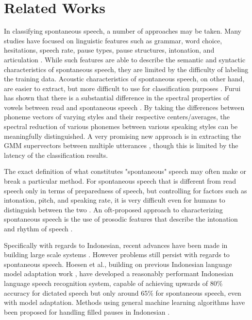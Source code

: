 \documentclass[conference]{IEEEtran}
\begin{document}
\section{Related Works}

In classifying spontaneous speech, a number of approaches may be taken.
Many studies have focused on linguistic features such as grammar, word choice, hesitations, speech rate, pause types, pause structures, intonation, and articulation \cite{barik}.
While such features are able to describe the semantic and syntactic characteristics of spontaneous speech, they are limited by the difficulty of labeling the training data.
Acoustic characteristics of spontaneous speech, on other hand, are easier to extract, but more difficult to use for classification purposes \cite{nakamura}.
Furui has shown that there is a substantial difference in the spectral properties of vowels between read and spontaneous speech \cite{furui1}.
By taking the differences between phoneme vectors of varying styles and their respective centers/averages, the spectral reduction of various phonemes between various speaking styles can be meaningfully distinguished.
A very promising new approach is in extracting the GMM supervectors between multiple utterances \cite{asami}, though this is limited by the latency of the classification results.

The exact definition of what constitutes "spontaneous" speech may often make or break a particular method.
For spontaneous speech that is different from read speech only in terms of preparedness of speech, but controlling for factors such as intonation, pitch, and speaking rate, it is very difficult even for humans to distinguish between the two \cite{laan}.
An oft-proposed approach to characterizing spontaneous speech is the use of prosodic features that describe the intonation and rhythm of speech \cite{silverman}.

Specifically with regards to Indonesian, recent advances have been made in building large scale systems \cite{lestari}\cite{sakti}.
However problems still persist with regards to spontaneous speech.
Hoesen et al., building on previous Indonesian language model adaptation work \cite{lestari2}, have developed a reasonably performant Indonesian language speech recognition system, capable of achieving upwards of 80\% accuracy for dictated speech but only around 65\% for spontaneous speech, even with model adaptation.
Methods using general machine learning algorithms have been proposed for handling filled pauses in Indonesian \cite{sani}.
\end{document}
